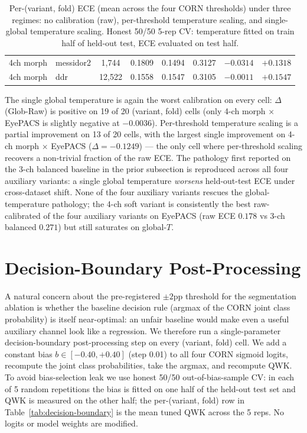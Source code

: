 \documentclass[11pt]{article}
\begin{document}
\begin{table}[ht]
\begin{tabular}{llcccccc}
4ch morph      & messidor2 &  1{,}744 & 0.1809 & 0.1494 & 0.3127 & $-0.0314$ & $+0.1318$ \\
4ch morph      & ddr       & 12{,}522 & 0.1558 & 0.1547 & 0.3105 & $-0.0011$ & $+0.1547$ \\
\bottomrule
\end{tabular}
\caption{Per-(variant, fold) ECE (mean across the four CORN thresholds) under three regimes: no calibration (raw), per-threshold temperature scaling, and single-global temperature scaling. Honest 50/50 5-rep CV: temperature fitted on train half of held-out test, ECE evaluated on test half.}
\label{tab:cal-all-variants}
\end{table}

The single global temperature is again the worst calibration on every cell: $\Delta$(Glob-Raw) is positive on 19 of 20 (variant, fold) cells (only 4-ch morph $\times$ EyePACS is slightly negative at $-0.0036$). Per-threshold temperature scaling is a partial improvement on 13 of 20 cells, with the largest single improvement on 4-ch morph $\times$ EyePACS ($\Delta = -0.1249$) --- the only cell where per-threshold scaling recovers a non-trivial fraction of the raw ECE. The pathology first reported on the 3-ch balanced baseline in the prior subsection is reproduced across all four auxiliary variants: a single global temperature \emph{worsens} held-out-test ECE under cross-dataset shift. None of the four auxiliary variants rescues the global-temperature pathology; the 4-ch soft variant is consistently the best raw-calibrated of the four auxiliary variants on EyePACS (raw ECE $0.178$ vs 3-ch balanced $0.271$) but still saturates on global-$T$.

\section{Decision-Boundary Post-Processing}

A natural concern about the pre-registered $\pm 2$pp threshold for the segmentation ablation is whether the baseline decision rule (argmax of the CORN joint class probability) is itself near-optimal: an unfair baseline would make even a useful auxiliary channel look like a regression. We therefore run a single-parameter decision-boundary post-processing step on every (variant, fold) cell. We add a constant bias $b \in [-0.40, +0.40]$ (step 0.01) to all four CORN sigmoid logits, recompute the joint class probabilities, take the argmax, and recompute QWK. To avoid bias-selection leak we use honest 50/50 out-of-bias-sample CV: in each of 5 random repetitions the bias is fitted on one half of the held-out test set and QWK is measured on the other half; the per-(variant, fold) row in Table~\ref{tab:decision-boundary} is the mean tuned QWK across the 5 reps. No logits or model weights are modified.
\end{document}
